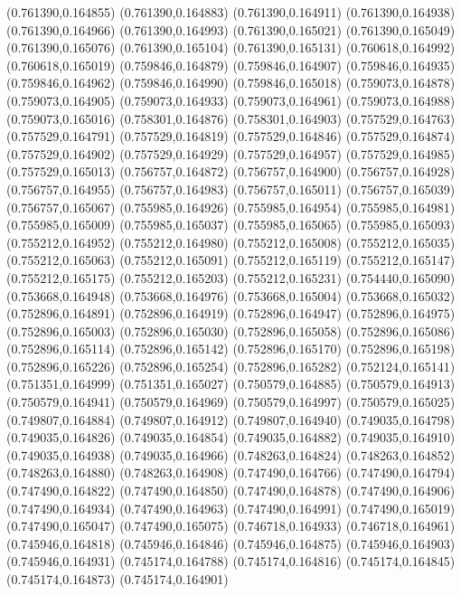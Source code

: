 (0.761390,0.164855)
(0.761390,0.164883)
(0.761390,0.164911)
(0.761390,0.164938)
(0.761390,0.164966)
(0.761390,0.164993)
(0.761390,0.165021)
(0.761390,0.165049)
(0.761390,0.165076)
(0.761390,0.165104)
(0.761390,0.165131)
(0.760618,0.164992)
(0.760618,0.165019)
(0.759846,0.164879)
(0.759846,0.164907)
(0.759846,0.164935)
(0.759846,0.164962)
(0.759846,0.164990)
(0.759846,0.165018)
(0.759073,0.164878)
(0.759073,0.164905)
(0.759073,0.164933)
(0.759073,0.164961)
(0.759073,0.164988)
(0.759073,0.165016)
(0.758301,0.164876)
(0.758301,0.164903)
(0.757529,0.164763)
(0.757529,0.164791)
(0.757529,0.164819)
(0.757529,0.164846)
(0.757529,0.164874)
(0.757529,0.164902)
(0.757529,0.164929)
(0.757529,0.164957)
(0.757529,0.164985)
(0.757529,0.165013)
(0.756757,0.164872)
(0.756757,0.164900)
(0.756757,0.164928)
(0.756757,0.164955)
(0.756757,0.164983)
(0.756757,0.165011)
(0.756757,0.165039)
(0.756757,0.165067)
(0.755985,0.164926)
(0.755985,0.164954)
(0.755985,0.164981)
(0.755985,0.165009)
(0.755985,0.165037)
(0.755985,0.165065)
(0.755985,0.165093)
(0.755212,0.164952)
(0.755212,0.164980)
(0.755212,0.165008)
(0.755212,0.165035)
(0.755212,0.165063)
(0.755212,0.165091)
(0.755212,0.165119)
(0.755212,0.165147)
(0.755212,0.165175)
(0.755212,0.165203)
(0.755212,0.165231)
(0.754440,0.165090)
(0.753668,0.164948)
(0.753668,0.164976)
(0.753668,0.165004)
(0.753668,0.165032)
(0.752896,0.164891)
(0.752896,0.164919)
(0.752896,0.164947)
(0.752896,0.164975)
(0.752896,0.165003)
(0.752896,0.165030)
(0.752896,0.165058)
(0.752896,0.165086)
(0.752896,0.165114)
(0.752896,0.165142)
(0.752896,0.165170)
(0.752896,0.165198)
(0.752896,0.165226)
(0.752896,0.165254)
(0.752896,0.165282)
(0.752124,0.165141)
(0.751351,0.164999)
(0.751351,0.165027)
(0.750579,0.164885)
(0.750579,0.164913)
(0.750579,0.164941)
(0.750579,0.164969)
(0.750579,0.164997)
(0.750579,0.165025)
(0.749807,0.164884)
(0.749807,0.164912)
(0.749807,0.164940)
(0.749035,0.164798)
(0.749035,0.164826)
(0.749035,0.164854)
(0.749035,0.164882)
(0.749035,0.164910)
(0.749035,0.164938)
(0.749035,0.164966)
(0.748263,0.164824)
(0.748263,0.164852)
(0.748263,0.164880)
(0.748263,0.164908)
(0.747490,0.164766)
(0.747490,0.164794)
(0.747490,0.164822)
(0.747490,0.164850)
(0.747490,0.164878)
(0.747490,0.164906)
(0.747490,0.164934)
(0.747490,0.164963)
(0.747490,0.164991)
(0.747490,0.165019)
(0.747490,0.165047)
(0.747490,0.165075)
(0.746718,0.164933)
(0.746718,0.164961)
(0.745946,0.164818)
(0.745946,0.164846)
(0.745946,0.164875)
(0.745946,0.164903)
(0.745946,0.164931)
(0.745174,0.164788)
(0.745174,0.164816)
(0.745174,0.164845)
(0.745174,0.164873)
(0.745174,0.164901)
